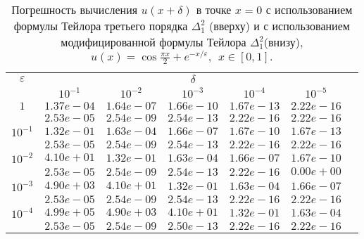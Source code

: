 \documentclass[10pt,twoside]{uz_kgu}
\begin{document}
\begin{table} [!htb]
 \caption {Погрешность вычисления $u(x+ \delta)$ в точке $x=0$ с использованием формулы Тейлора третьего порядка $\Delta_1^2$ (вверху) и с использованием модифицированной формулы Тейлора $\Delta_1^2$(внизу),
 $u(x)=  \cos \frac{\pi x}{2} + e^{-x/\varepsilon} ,\ \    x\in [0,1].$}
	\begin{center}
		\begin{tabular}{|c|c|c|c|c|c|c}
			\cline{1-6} $\varepsilon$ & \multicolumn{5}{c|}{$\delta$} \\
			\cline{2-6} &$10^{-1}$ & $10^{-2}$ & $10^{-3}$  & $10^{-4}$& $10^{-5}$\\
			\cline{1-6}
			$1$
			&$1.37e-04$&$1.64e-07$&$1.66e-10$&$1.67e-13$& $2.22e-16$\\
			&$2.53e-05$&$2.54e-09$&$2.54e-13$&$2.22e-16$& $2.22e-16$\\
			\cline{1-6}
			$10^{-1}$
			&$1.32e-01$&$1.63e-04$&$1.66e-07$&$1.67e-10$&$1.67e-13$\\
			&$2.53e-05$&$2.54e-09$&$2.54e-13$&$2.22e-16$&$2.22e-16$\\
			\cline{1-6}
			$10^{-2}$
			&$4.10e+01$&$1.32e-01$&$1.63e-04$&$1.66e-07$&$1.67e-10$\\
			&$2.53e-05$&$2.54e-09$&$2.54e-13$&$2.22e-16$&$0.00e+00$\\
			\cline{1-6}
			$10^{-3}$
			&$4.90e+03$&$4.10e+01$&$1.32e-01$&$1.63e-04$&$1.66e-07$\\
			&$2.53e-05$&$2.54e-09$&$2.54e-13$&$2.22e-16$&$2.22e-16$\\
			\cline{1-6}
			$10^{-4}$
			&$4.99e+05$&$4.90e+03$&$4.10e+01$&$1.32e-01$&$1.63e-04$\\
			&$2.53e-05$&$2.54e-09$&$2.50e-13$&$2.22e-16$&$2.22e-16$\\
			\cline{1-6}
		\end{tabular}
	\end{center}
\end{table}


\newpage
\end{document}
